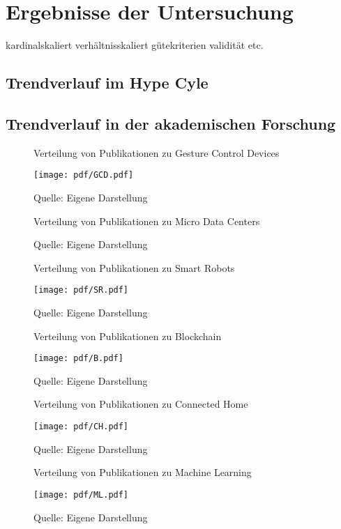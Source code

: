 \section{Ergebnisse der Untersuchung}
kardinalskaliert
verhältnisskaliert
gütekriterien validität etc.

\subsection{Trendverlauf im Hype Cyle}



\subsection{Trendverlauf in der akademischen Forschung}
\begin{figure}
	\centering
	\caption{Verteilung von Publikationen zu \glqq Gesture Control Devices\grqq}
	\texttt{[image: pdf/GCD.pdf]}
	\caption*{Quelle: Eigene Darstellung}
	\label{fig:gcd_pub}
\end{figure}

\begin{figure}
	\centering
	\caption{Verteilung von Publikationen zu \glqq Micro Data Centers\grqq}
	\caption*{Quelle: Eigene Darstellung}
	\label{fig:mdc_pub}
\end{figure}

\begin{figure}
	\centering
	\caption{Verteilung von Publikationen zu \glqq Smart Robots\grqq}
	\texttt{[image: pdf/SR.pdf]}
	\caption*{Quelle: Eigene Darstellung}
	\label{fig:sr_pub}
\end{figure}

\begin{figure}
\centering
\caption{Verteilung von Publikationen zu \glqq Blockchain\grqq}
\texttt{[image: pdf/B.pdf]}
\caption*{Quelle: Eigene Darstellung}
\label{fig:b_pub}
\end{figure}

\begin{figure}
	\centering
	\caption{Verteilung von Publikationen zu \glqq Connected Home\grqq}
	\texttt{[image: pdf/CH.pdf]}
	\caption*{Quelle: Eigene Darstellung}
	\label{fig:ch_pub}
\end{figure}

\begin{figure}
\centering
\caption{Verteilung von Publikationen zu \glqq Machine Learning\grqq}
\texttt{[image: pdf/ML.pdf]}
\caption*{Quelle: Eigene Darstellung}
\label{fig:ml_pub}
\end{figure}

